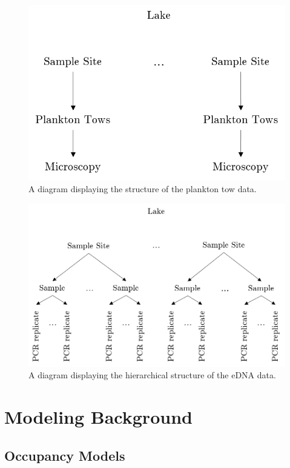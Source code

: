 \documentclass[12pt]{article}\usepackage[]{graphicx}\usepackage[]{color}
\begin{document}
\begin{figure}[h]
	\centering
	\includegraphics[scale = 0.7]{planktontow}
	\caption{A diagram displaying the structure of the plankton tow data.}
	\label{pt}
\end{figure}

\begin{figure}[h]
	\centering
	\includegraphics[scale = 0.7]{eDNA}
	\caption{A diagram displaying the hierarchical structure of the eDNA data.}
	\label{edna}
\end{figure}


\section{Modeling Background}

\subsection{Occupancy Models}
\end{document}
